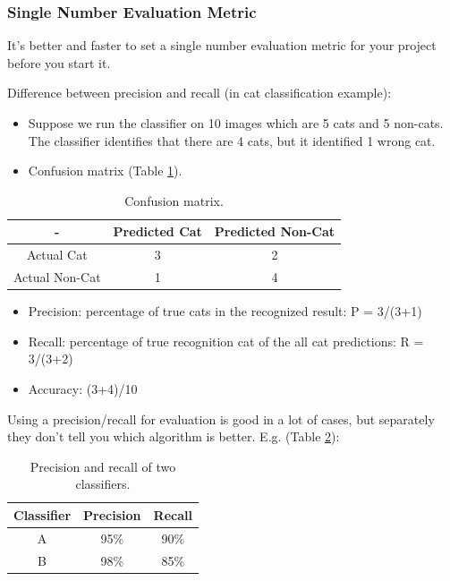 \subsubsection{Single Number Evaluation Metric}
It's better and faster to set a single number evaluation metric for your project before you start it.

Difference between precision and recall (in cat classification example):

\begin{itemize}
    \item Suppose we run the classifier on 10 images which are 5 cats and 5 non-cats. The classifier identifies that there are 4 cats, but it identified 1 wrong cat.
    \item Confusion matrix (Table \ref{confusion-matrix}).
\end{itemize}

\begin{table}[!htbp]
    \centering
    \begin{tabular}{c|c|c}
        \hline
        - & Predicted Cat & Predicted Non-Cat \\
        \hline
        Actual Cat & 3 & 2\\
        Actual Non-Cat & 1 & 4\\
        \hline
    \end{tabular}
    \caption{Confusion matrix.}
    \label{confusion-matrix}
\end{table}

\begin{itemize}
    \item Precision: percentage of true cats in the recognized result: P = 3/(3+1)
    \item Recall: percentage of true recognition cat of the all cat predictions: R = 3/(3+2)
    \item Accuracy: (3+4)/10
\end{itemize}

Using a precision/recall for evaluation is good in a lot of cases, but separately they don't tell you which algorithm is better. E.g. (Table \ref{pr-classifiers}):

\begin{table}[!htbp]
    \centering
    \begin{tabular}{c|c|c}
        \hline
        Classifier & Precision & Recall \\
        \hline
        A & 95\% & 90\%\\
        B & 98\% & 85\%\\
        \hline
    \end{tabular}
    \caption{Precision and recall of two classifiers.}
    \label{pr-classifiers}
\end{table}

